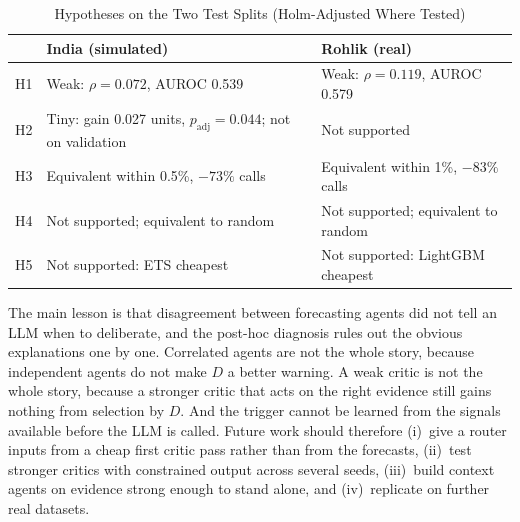 \documentclass[conference]{IEEEtran}
\begin{document}
\begin{table}[t]
\caption{Hypotheses on the Two Test Splits (Holm-Adjusted Where Tested)}
\label{tab:hyp}
\centering
\footnotesize
\begin{tabularx}{\columnwidth}{@{}lXX@{}}
\toprule
 & India (simulated) & Rohlik (real) \\
\midrule
H1 & Weak: $\rho=0.072$, AUROC 0.539 & Weak: $\rho=0.119$, AUROC 0.579 \\
H2 & Tiny: gain 0.027 units, $p_{\mathrm{adj}}=0.044$; not on validation & Not supported \\
H3 & Equivalent within 0.5\%, $-73\%$ calls & Equivalent within 1\%, $-83\%$ calls \\
H4 & Not supported; equivalent to random & Not supported; equivalent to random \\
H5 & Not supported: ETS cheapest & Not supported: LightGBM cheapest \\
\bottomrule
\end{tabularx}
\end{table}

The main lesson is that disagreement between forecasting agents did not tell an LLM when to
deliberate, and the post-hoc diagnosis rules out the obvious explanations one by one. Correlated
agents are not the whole story, because independent agents do not make $D$ a better warning. A weak
critic is not the whole story, because a stronger critic that acts on the right evidence still gains
nothing from selection by $D$. And the trigger cannot be learned from the signals available before
the LLM is called. Future work should therefore (i)~give a router inputs from a cheap first critic
pass rather than from the forecasts, (ii)~test stronger critics with constrained output across
several seeds, (iii)~build context agents on evidence strong enough to stand alone, and
(iv)~replicate on further real datasets.
\end{document}
